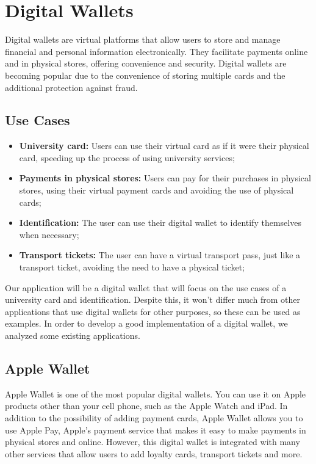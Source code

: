 \documentclass{article}
\begin{document}
\section{Digital Wallets}

Digital wallets are virtual platforms that allow users to store and manage financial and personal information electronically. They facilitate payments online and in physical stores, offering convenience and security. Digital wallets are becoming popular due to the convenience of storing multiple cards and the additional protection against fraud.

\subsection{Use Cases}

\begin{itemize}
    \item \textbf{University card:} Users can use their virtual card as if it were their physical card, speeding up the process of using university services;
    \item \textbf{Payments in physical stores:} Users can pay for their purchases in physical stores, using their virtual payment cards and avoiding the use of physical cards;
    \item \textbf{Identification:} The user can use their digital wallet to identify themselves when necessary;
    \item \textbf{Transport tickets:} The user can have a virtual transport pass, just like a transport ticket, avoiding the need to have a physical ticket;
\end{itemize}


Our application will be a digital wallet that will focus on the use cases of a university card and identification. Despite this, it won't differ much from other applications that use digital wallets for other purposes, so these can be used as examples. In order to develop a good implementation of a digital wallet, we analyzed some existing applications.

\subsection{Apple Wallet}
Apple Wallet is one of the most popular digital wallets. You can use it on Apple products other than your cell phone, such as the Apple Watch and iPad. In addition to the possibility of adding payment cards, Apple Wallet allows you to use Apple Pay, Apple's payment service that makes it easy to make payments in physical stores and online. However, this digital wallet is integrated with many other services that allow users to add loyalty cards, transport tickets and more.
\end{document}
